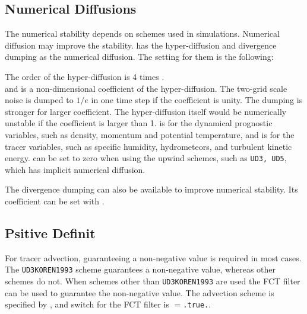 \subsection{Numerical Diffusions}

The numerical stability depends on schemes used in simulations.
Numerical diffusion may improve the stability.
\scalerm has the hyper-diffusion and divergence dumping as the numerical diffusion.
The setting for them is the following:


The order of the hyper-diffusion is 4 times .\\
 and  is a non-dimensional coefficient of the hyper-diffusion.
The two-grid scale noise is dumped to $1/e$ in one time step if the coefficient is unity.
The dumping is stronger for larger coefficient.
The hyper-diffusion itself would be numerically unstable if the coefficient is larger than 1.
 is for the dynamical prognostic variables, such as density, momentum and potential temperature, and  is for the tracer variables, such as specific humidity, hydrometeors, and turbulent kinetic energy.
 can be set to zero when using the upwind schemes, such as \verb|UD3, UD5|, which has implicit numerical diffusion.


The divergence dumping can also be available to improve numerical stability.
Its coefficient can be set with .


\subsection{Psitive Definit}

For tracer advection, guaranteeing a non-negative value is required in most cases.\\
The \verb|UD3KOREN1993| scheme guarantees a non-negative value, whereas other schemes do not.
When schemes other than \verb|UD3KOREN1993| are used the FCT filter can be used to guarantee the non-negative value.
The advection scheme is specified by , and switch for the FCT filter is $=$\verb|.true.|.


